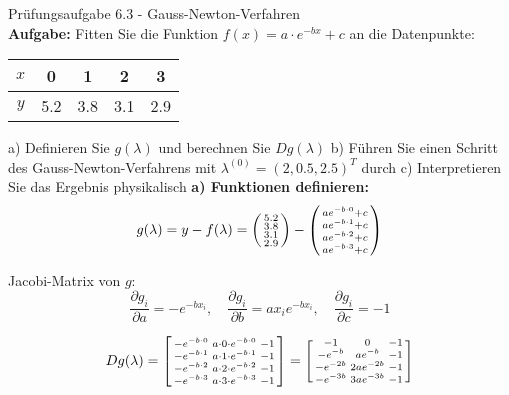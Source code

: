 \begin{example2}{Prüfungsaufgabe 6.3 - Gauss-Newton-Verfahren}\\
\textbf{Aufgabe:} Fitten Sie die Funktion $f(x) = a \cdot e^{-bx} + c$ an die Datenpunkte:

\begin{center}
\begin{tabular}{|c|c|c|c|c|}
\hline
$x$ & 0 & 1 & 2 & 3 \\
\hline
$y$ & 5.2 & 3.8 & 3.1 & 2.9 \\
\hline
\end{tabular}
\end{center}

a) Definieren Sie $g(\lambda)$ und berechnen Sie $Dg(\lambda)$
b) Führen Sie einen Schritt des Gauss-Newton-Verfahrens mit $\lambda^{(0)} = (2, 0.5, 2.5)^T$ durch
c) Interpretieren Sie das Ergebnis physikalisch
\tcblower
\textbf{a) Funktionen definieren:}
$$g(\lambda) = y - f(\lambda) = \begin{psmallmatrix} 5.2 \\ 3.8 \\ 3.1 \\ 2.9 \end{psmallmatrix} - \begin{psmallmatrix} ae^{-b \cdot 0} + c \\ ae^{-b \cdot 1} + c \\ ae^{-b \cdot 2} + c \\ ae^{-b \cdot 3} + c \end{psmallmatrix}$$

Jacobi-Matrix von $g$:
$$\frac{\partial g_i}{\partial a} = -e^{-bx_i}, \quad \frac{\partial g_i}{\partial b} = ax_ie^{-bx_i}, \quad \frac{\partial g_i}{\partial c} = -1$$

$$Dg(\lambda) = \begin{bsmallmatrix}
-e^{-b \cdot 0} & a \cdot 0 \cdot e^{-b \cdot 0} & -1 \\
-e^{-b \cdot 1} & a \cdot 1 \cdot e^{-b \cdot 1} & -1 \\
-e^{-b \cdot 2} & a \cdot 2 \cdot e^{-b \cdot 2} & -1 \\
-e^{-b \cdot 3} & a \cdot 3 \cdot e^{-b \cdot 3} & -1
\end{bsmallmatrix} = \begin{bsmallmatrix}
-1 & 0 & -1 \\
-e^{-b} & ae^{-b} & -1 \\
-e^{-2b} & 2ae^{-2b} & -1 \\
-e^{-3b} & 3ae^{-3b} & -1
\end{bsmallmatrix}$$


\end{example2}

